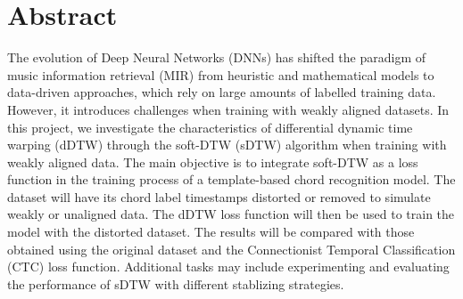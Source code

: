 \documentclass[a4paper,11pt,\myPageLayout]{book}
\begin{document}
\frontmatter
\newpage


\cleardoublepage{}

\pagestyle{mine}
\newpage

\section*{Abstract}
The evolution of Deep Neural Networks (DNNs) has shifted the paradigm of music information retrieval (MIR) from heuristic and mathematical models to data-driven approaches, which rely on large amounts of labelled training data. However, it introduces challenges when training with weakly aligned datasets. In this project, we investigate the characteristics of differential dynamic time warping (dDTW) through the soft-DTW (sDTW) algorithm when training with weakly aligned data. The main objective is to integrate soft-DTW as a loss function in the training process of a template-based chord recognition model. The dataset will have its chord label timestamps distorted or removed to simulate weakly or unaligned data. The dDTW loss function will then be used to train the model with the distorted dataset. The results will be compared with those obtained using the original dataset and the Connectionist Temporal Classification (CTC) loss function. Additional tasks may include experimenting and evaluating the performance of sDTW with different stablizing strategies.




\end{document}
